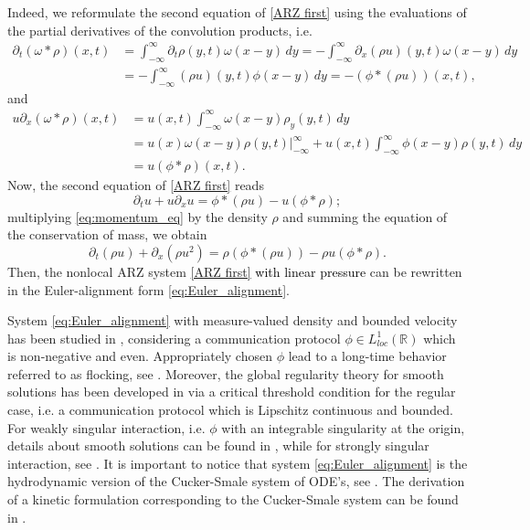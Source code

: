 \documentclass[11pt,a4paper,oneside]{amsart}
\newcommand\R{\mathbb{R}}
\begin{document}
Indeed, we reformulate the second equation of \eqref{ARZ first} using the evaluations of the partial derivatives 
of the convolution products, i.e. 
\begin{align*}
    \partial_t(\omega\ast\rho)(x,t)
    &=\int_{-\infty}^\infty\partial_t\rho(y,t)\omega(x-y)\,dy=-\int_{-\infty}^\infty \partial_x(\rho u)(y,t)\omega(x-y)\,dy \\
    &
    =-\int_{-\infty}^\infty (\rho u)(y,t) \phi
    (x-y)\,dy =- (\phi \ast (\rho u)) (x,t),
\end{align*}
and 
\begin{align*}
   u \partial_x(\omega\ast\rho)(x,t)&= u(x,t)\int_{-\infty}^\infty \omega(x-y)\rho_y(y,t)\,dy \\
   &=u(x)\omega(x-y)\rho(y,t)|_{-\infty}^\infty+u(x,t)\int_{-\infty}^\infty\phi(x-y)\rho(y,t)\,dy \\ 
   &=u(\phi\ast\rho)(x,t).
\end{align*}
Now, the second equation of \eqref{ARZ first} reads
\begin{equation}\label{eq:momentum_eq}
    \partial_tu+u\partial_xu=\phi\ast(\rho u)-u(\phi\ast\rho);
\end{equation}
multiplying \eqref{eq:momentum_eq} by the density $\rho$ and summing the equation of the conservation of mass, we obtain
\begin{equation*}
    \partial_t(\rho u)+\partial_x(\rho u^2)=\rho(\phi\ast(\rho u))-\rho u(\phi\ast\rho).
\end{equation*}
Then, the nonlocal ARZ system \eqref{ARZ first} \textcolor{black}{with linear pressure} can be rewritten in the Euler-alignment form \eqref{eq:Euler_alignment}.

System \eqref{eq:Euler_alignment} with measure-valued density and bounded velocity has been studied in \cite{Leslie-Tan}, 
considering a communication protocol $\phi\in L^1_{loc}(\R)$ which is non-negative and even.
Appropriately chosen $\phi$ lead to a long-time behavior referred to as flocking, see \cite{Shvydkoy2021}. 
Moreover, the global regularity theory for smooth solutions has been developed in \cite{Carrillo2016} 
via a critical threshold condition for the regular case, i.e. a communication protocol which is Lipschitz continuous and bounded.
For weakly singular interaction, i.e. $\phi$ with an integrable singularity at the origin, details about smooth solutions can be found 
in \cite{Leslie2020}, while for strongly singular interaction, see \cite{Do2017, Kiselev2018, Shvydkoy2017}.
It is important to notice that system \eqref{eq:Euler_alignment} is the hydrodynamic version of the Cucker-Smale system of ODE's, 
see \cite{Cucker2007}.
The derivation of a kinetic formulation corresponding to the Cucker-Smale system can be found in \cite{Ha2008, Carrillo2010, Mucha2017}.
\end{document}
